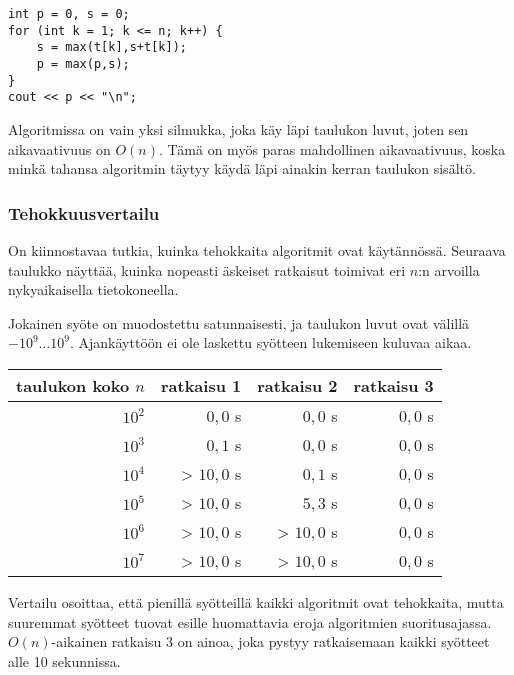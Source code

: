 \begin{lstlisting}
int p = 0, s = 0;
for (int k = 1; k <= n; k++) {
    s = max(t[k],s+t[k]);
    p = max(p,s);
}
cout << p << "\n";
\end{lstlisting}

Algoritmissa on vain yksi silmukka,
joka käy läpi taulukon luvut,
joten sen aikavaativuus on $O(n)$.
Tämä on myös paras mahdollinen aikavaativuus,
koska minkä tahansa algoritmin täytyy käydä
läpi ainakin kerran taulukon sisältö.

\subsubsection{Tehokkuusvertailu}

On kiinnostavaa tutkia, kuinka tehokkaita algoritmit
ovat käytännössä.
Seuraava taulukko näyttää, kuinka nopeasti äskeiset
ratkaisut toimivat eri $n$:n arvoilla
nykyaikaisella tietokoneella.

Jokainen syöte on muodostettu satunnaisesti,
ja taulukon luvut ovat välillä $-10^9 \ldots 10^9$.
Ajankäyttöön ei ole laskettu syötteen lukemiseen
kuluvaa aikaa.

\begin{center}
\begin{tabular}{rrrr}
taulukon koko $n$ & ratkaisu 1 & ratkaisu 2 & ratkaisu 3 \\
\hline
$10^2$ & $0{,}0$ s & $0{,}0$ s & $0{,}0$ s \\
$10^3$ & $0{,}1$ s & $0{,}0$ s & $0{,}0$ s \\
$10^4$ & > $10,0$ s & $0{,}1$ s & $0{,}0$ s \\
$10^5$ & > $10,0$ s & $5{,}3$ s & $0{,}0$ s \\
$10^6$ & > $10,0$ s & > $10,0$ s & $0{,}0$ s \\
$10^7$ & > $10,0$ s & > $10,0$ s & $0{,}0$ s \\
\end{tabular}
\end{center}

Vertailu osoittaa,
että pienillä syötteillä kaikki algoritmit
ovat tehokkaita,
mutta suuremmat syötteet tuovat esille
huomattavia eroja algoritmien suoritusajassa.
$O(n)$-aikainen ratkaisu 3 on ainoa,
joka pystyy ratkaisemaan kaikki syötteet
alle 10 sekunnissa.

